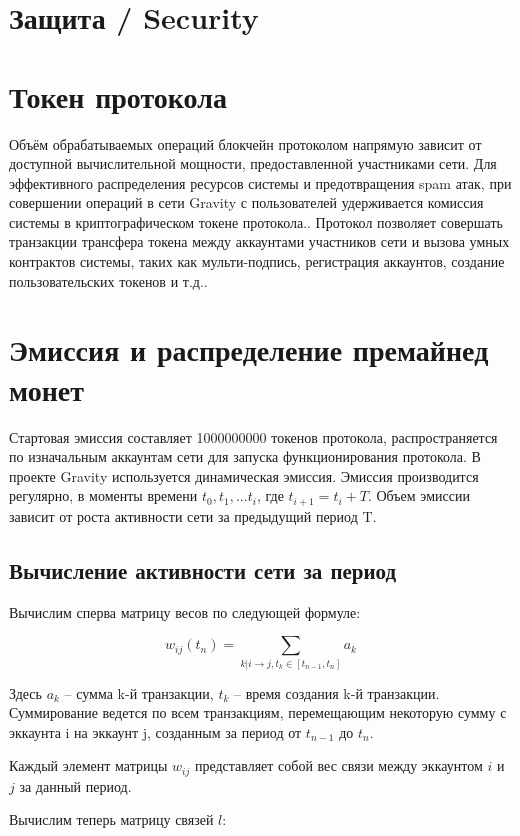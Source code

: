 \documentclass[a4paper,12pt]{article}
\begin{document}
\section{Защита / Security}

\section{Токен протокола}
Объём обрабатываемых операций блокчейн протоколом напрямую зависит от доступной вычислительной мощности, предоставленной участниками сети. Для эффективного распределения ресурсов системы и предотвращения spam атак, при совершении операций в сети Gravity с пользователей удерживается комиссия системы в криптографическом токене протокола.. 
Протокол позволяет совершать транзакции трансфера токена между аккаунтами участников сети и вызова умных контрактов системы, таких как мульти-подпись, регистрация аккаунтов, создание пользовательских токенов и т.д.. 

\section{Эмиссия и распределение премайнед монет}

Стартовая эмиссия составляет 1000000000 токенов протокола, распространяется по изначальным аккаунтам сети для запуска функционирования протокола.   
В проекте Gravity используется динамическая эмиссия. Эмиссия производится регулярно, в моменты времени $t_0, t_1, ... t_i$, где $t_{i+1} = t_i + T$. Объем эмиссии зависит от роста активности сети за предыдущий период T.

\subsection{Вычисление активности сети за период}

Вычислим сперва матрицу весов по следующей формуле:

$$
w_{ij}(t_n)=\sum_{k|i \to j, t_k \in [t_{n-1}, t_n]}a_k
$$

Здесь $a_k$ – сумма k-й транзакции, $t_k$ – время создания k-й транзакции. Суммирование ведется по всем транзакциям, перемещающим некоторую сумму с эккаунта i на эккаунт j, созданным за период от $t_{n-1}$ до $t_n$.

Каждый элемент матрицы $w_{ij}$ представляет собой вес связи между эккаунтом $i$ и $j$ за данный период.

Вычислим теперь матрицу связей $l$:
\end{document}
